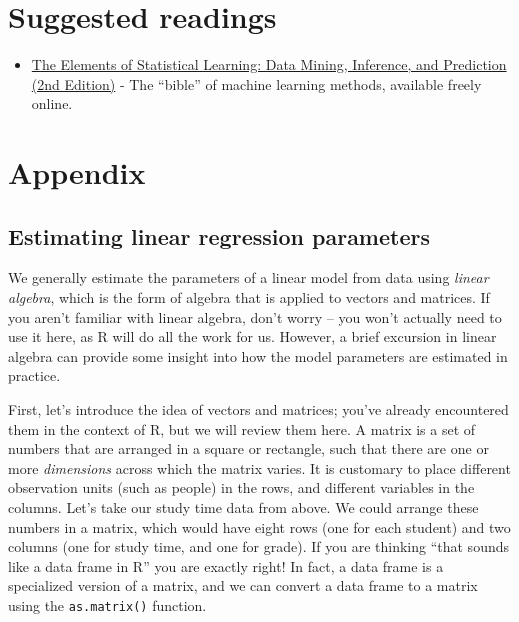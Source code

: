 \documentclass[
  12pt,
]{book}
\providecommand{\tightlist}{%
  \setlength{\itemsep}{0pt}\setlength{\parskip}{0pt}}
\begin{document}
\hypertarget{suggested-readings-10}{%
\section{Suggested readings}\label{suggested-readings-10}}

\begin{itemize}
\tightlist
\item
  \href{https://web.stanford.edu/~hastie/Papers/ESLII.pdf}{The Elements of Statistical Learning: Data Mining, Inference, and Prediction (2nd Edition)} - The ``bible'' of machine learning methods, available freely online.
\end{itemize}

\hypertarget{appendix-5}{%
\section{Appendix}\label{appendix-5}}

\hypertarget{estimating-linear-regression-parameters}{%
\subsection{Estimating linear regression parameters}\label{estimating-linear-regression-parameters}}

We generally estimate the parameters of a linear model from data using \emph{linear algebra}, which is the form of algebra that is applied to vectors and matrices. If you aren't familiar with linear algebra, don't worry -- you won't actually need to use it here, as R will do all the work for us. However, a brief excursion in linear algebra can provide some insight into how the model parameters are estimated in practice.

First, let's introduce the idea of vectors and matrices; you've already encountered them in the context of R, but we will review them here. A matrix is a set of numbers that are arranged in a square or rectangle, such that there are one or more \emph{dimensions} across which the matrix varies. It is customary to place different observation units (such as people) in the rows, and different variables in the columns. Let's take our study time data from above. We could arrange these numbers in a matrix, which would have eight rows (one for each student) and two columns (one for study time, and one for grade). If you are thinking ``that sounds like a data frame in R'' you are exactly right! In fact, a data frame is a specialized version of a matrix, and we can convert a data frame to a matrix using the \texttt{as.matrix()} function.
\end{document}
